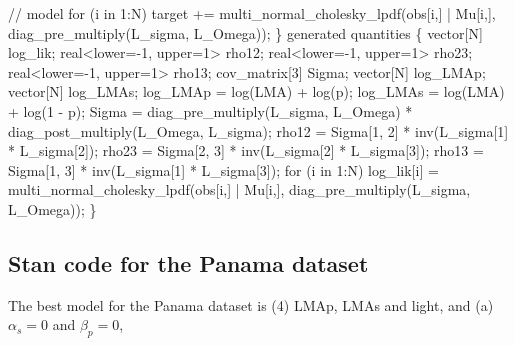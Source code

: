 \documentclass[
  12pt,
  letterpaper,
  DIV=11,
  numbers=noendperiod]{scrartcl}
\newenvironment{Shaded}{\begin{snugshade}}{\end{snugshade}}
\newcommand{\CommentTok}[1]{\textcolor[rgb]{0.37,0.37,0.37}{#1}}
\newcommand{\ControlFlowTok}[1]{\textcolor[rgb]{0.00,0.23,0.31}{#1}}
\newcommand{\DataTypeTok}[1]{\textcolor[rgb]{0.68,0.00,0.00}{#1}}
\newcommand{\DecValTok}[1]{\textcolor[rgb]{0.68,0.00,0.00}{#1}}
\newcommand{\KeywordTok}[1]{\textcolor[rgb]{0.00,0.23,0.31}{#1}}
\newcommand{\NormalTok}[1]{\textcolor[rgb]{0.00,0.23,0.31}{#1}}
\begin{document}
\begin{Shaded}
\begin{Highlighting}[]
  \CommentTok{// model}
  \ControlFlowTok{for}\NormalTok{ (i }\ControlFlowTok{in} \DecValTok{1}\NormalTok{:N)}
     \KeywordTok{target +=}\NormalTok{ multi\_normal\_cholesky\_lpdf(obs[i,] | Mu[i,], diag\_pre\_multiply(L\_sigma, L\_Omega));}
\NormalTok{\}}
\KeywordTok{generated quantities}\NormalTok{ \{}
  \DataTypeTok{vector}\NormalTok{[N] log\_lik;}
  \DataTypeTok{real}\NormalTok{\textless{}}\KeywordTok{lower}\NormalTok{={-}}\DecValTok{1}\NormalTok{, }\KeywordTok{upper}\NormalTok{=}\DecValTok{1}\NormalTok{\textgreater{} rho12;}
  \DataTypeTok{real}\NormalTok{\textless{}}\KeywordTok{lower}\NormalTok{={-}}\DecValTok{1}\NormalTok{, }\KeywordTok{upper}\NormalTok{=}\DecValTok{1}\NormalTok{\textgreater{} rho23;}
  \DataTypeTok{real}\NormalTok{\textless{}}\KeywordTok{lower}\NormalTok{={-}}\DecValTok{1}\NormalTok{, }\KeywordTok{upper}\NormalTok{=}\DecValTok{1}\NormalTok{\textgreater{} rho13;}
  \DataTypeTok{cov\_matrix}\NormalTok{[}\DecValTok{3}\NormalTok{] Sigma;}
  \DataTypeTok{vector}\NormalTok{[N] log\_LMAp;}
  \DataTypeTok{vector}\NormalTok{[N] log\_LMAs;}
\NormalTok{  log\_LMAp = log(LMA) + log(p);}
\NormalTok{  log\_LMAs = log(LMA) + log(}\DecValTok{1}\NormalTok{ {-} p);}
\NormalTok{  Sigma = diag\_pre\_multiply(L\_sigma, L\_Omega)}
\NormalTok{     * diag\_post\_multiply(L\_Omega\textquotesingle{}, L\_sigma);}
\NormalTok{  rho12 = Sigma[}\DecValTok{1}\NormalTok{, }\DecValTok{2}\NormalTok{] * inv(L\_sigma[}\DecValTok{1}\NormalTok{] * L\_sigma[}\DecValTok{2}\NormalTok{]);}
\NormalTok{  rho23 = Sigma[}\DecValTok{2}\NormalTok{, }\DecValTok{3}\NormalTok{] * inv(L\_sigma[}\DecValTok{2}\NormalTok{] * L\_sigma[}\DecValTok{3}\NormalTok{]);}
\NormalTok{  rho13 = Sigma[}\DecValTok{1}\NormalTok{, }\DecValTok{3}\NormalTok{] * inv(L\_sigma[}\DecValTok{1}\NormalTok{] * L\_sigma[}\DecValTok{3}\NormalTok{]);}
  \ControlFlowTok{for}\NormalTok{ (i }\ControlFlowTok{in} \DecValTok{1}\NormalTok{:N)}
\NormalTok{   log\_lik[i] = multi\_normal\_cholesky\_lpdf(obs[i,] | Mu[i,], diag\_pre\_multiply(L\_sigma, L\_Omega));}
\NormalTok{ \}}
\end{Highlighting}
\end{Shaded}

\hypertarget{stan-code-for-the-panama-dataset}{%
\subsection{Stan code for the Panama
dataset}\label{stan-code-for-the-panama-dataset}}

The best model for the Panama dataset is (4) LMAp, LMAs and light, and
(a) \(\alpha_s = 0\) and \(\beta_p = 0\),
\end{document}
